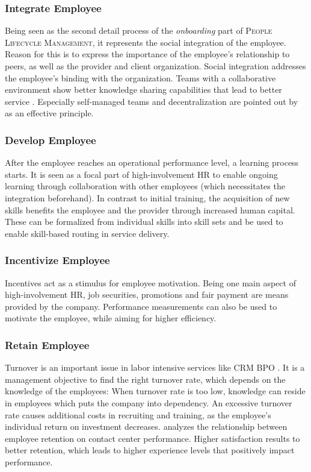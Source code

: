 	\subsubsection{Integrate Employee}
		Being seen as the second detail process of the \textit{onboarding} part of \textsc{People Lifecycle Management}, it represents the social integration of the employee. Reason for this is to express the importance of the employee's relationship to peers, as well as the provider and client organization. Social integration addresses the employee's binding with the organization. Teams with a collaborative environment show better knowledge sharing capabilities that lead to better service \citep{Batt_2002}. Especially self-managed teams and decentralization are pointed out by \cite{pfeffer1998seven} as an effective principle. 
		
	\subsubsection{Develop Employee}
		After the employee reaches an operational performance level, a learning process starts. It is seen as a focal part of high-involvement HR to enable ongoing learning through collaboration with other employees \citep{Batt2002} (which necessitates the integration beforehand). In contrast to initial training, the acquisition of new skills benefits the employee and the provider through increased human capital. These can be formalized from individual skills into skill sets and be used to enable skill-based routing in service delivery. 
	\subsubsection{Incentivize Employee}
		Incentives act as a stimulus for employee motivation. Being one main aspect of high-involvement HR, job securities, promotions and fair payment are means provided by the company. Performance measurements can also be used to motivate the employee, while aiming for higher efficiency. 
	\subsubsection{Retain Employee}
	
	Turnover is an important issue in labor intensive services like \acrshort{CRM} \acrshort{BPO} \citep[]{gross2006}. It is a management objective to find the right turnover rate, which depends on the knowledge of the employees: When turnover rate is too low, knowledge can reside in employees which puts the company into dependency. An excessive turnover rate causes additional costs in recruiting and training, as the employee's individual return on investment decreases. \cite{Whitt_2006} analyzes the relationship between employee retention on contact center performance. Higher satisfaction results to better retention, which leads to higher experience levels that positively impact performance. 
	
